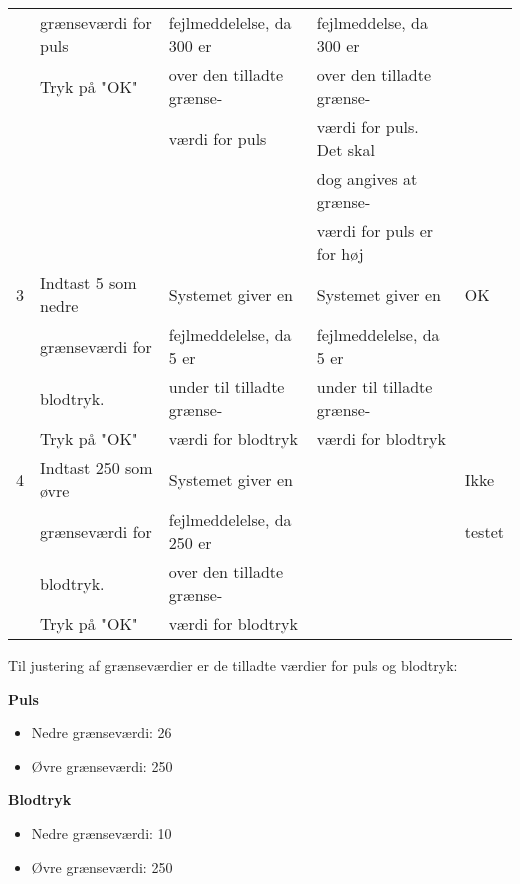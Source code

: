 \begin{table}[h!]
\begin{tabular}{lllll}
		\multicolumn{1}{l|}{} & \multicolumn{1}{l|}{grænseværdi for puls} & \multicolumn{1}{l|}{fejlmeddelelse, da 300 er} & \multicolumn{1}{l|}{fejlmeddelse, da 300 er} &  \\
		\multicolumn{1}{l|}{} & \multicolumn{1}{l|}{Tryk på "OK"} & \multicolumn{1}{l|}{over den tilladte grænse-} & \multicolumn{1}{l|}{over den tilladte grænse-} &  \\
		\multicolumn{1}{l|}{} & \multicolumn{1}{l|}{} & \multicolumn{1}{l|}{værdi for puls} & \multicolumn{1}{l|}{værdi for puls. Det skal} &  \\
		\multicolumn{1}{l|}{} & \multicolumn{1}{l|}{} & \multicolumn{1}{l|}{} & \multicolumn{1}{l|}{dog angives at grænse-} &  \\
		\multicolumn{1}{l|}{} & \multicolumn{1}{l|}{} & \multicolumn{1}{l|}{} & \multicolumn{1}{l|}{værdi for puls er for høj} &  \\ \hline
		\multicolumn{1}{l|}{3} & \multicolumn{1}{l|}{Indtast 5 som nedre} & \multicolumn{1}{l|}{Systemet giver en} & \multicolumn{1}{l|}{Systemet giver en} & OK \\
		\multicolumn{1}{l|}{} & \multicolumn{1}{l|}{grænseværdi for} & \multicolumn{1}{l|}{fejlmeddelelse, da 5 er} & \multicolumn{1}{l|}{fejlmeddelelse, da 5 er} &  \\
		\multicolumn{1}{l|}{} & \multicolumn{1}{l|}{blodtryk.} & \multicolumn{1}{l|}{under til tilladte grænse-} & \multicolumn{1}{l|}{under til tilladte grænse-} &  \\
		\multicolumn{1}{l|}{} & \multicolumn{1}{l|}{Tryk på "OK"} & \multicolumn{1}{l|}{værdi for blodtryk} & \multicolumn{1}{l|}{værdi for blodtryk} &  \\ \hline
		\multicolumn{1}{l|}{4} & \multicolumn{1}{l|}{Indtast 250 som øvre} & \multicolumn{1}{l|}{Systemet giver en} & \multicolumn{1}{l|}{} & Ikke \\
		\multicolumn{1}{l|}{} & \multicolumn{1}{l|}{grænseværdi for} & \multicolumn{1}{l|}{fejlmeddelelse, da 250 er} & \multicolumn{1}{l|}{} & testet \\
		\multicolumn{1}{l|}{} & \multicolumn{1}{l|}{blodtryk.} & \multicolumn{1}{l|}{over den tilladte grænse-} & \multicolumn{1}{l|}{} &  \\
		\multicolumn{1}{l|}{} & \multicolumn{1}{l|}{Tryk på "OK"} & \multicolumn{1}{l|}{værdi for blodtryk} & \multicolumn{1}{l|}{} & 
	\end{tabular}
\end{table}

Til justering af grænseværdier er de tilladte værdier for puls og blodtryk: 

\textbf{Puls}
\begin{itemize}
	\item Nedre grænseværdi: 26
	\item Øvre grænseværdi: 250
\end{itemize}

\textbf{Blodtryk}
\begin{itemize}
	\item Nedre grænseværdi: 10
	\item Øvre grænseværdi: 250
\end{itemize}

\vspace{1 cm}